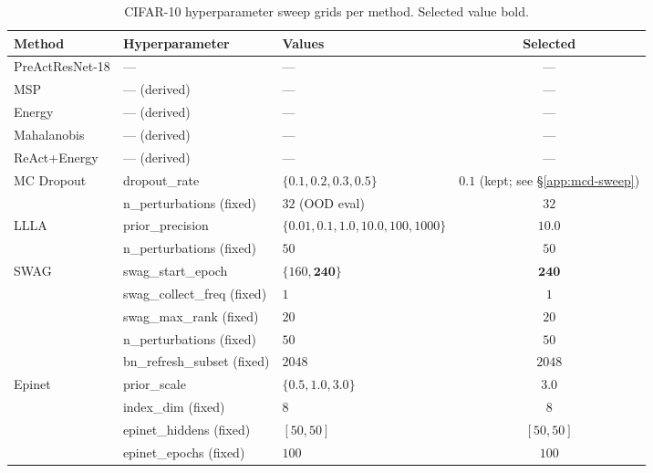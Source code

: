 \begin{table}[h]
\centering
\caption{CIFAR-10 hyperparameter sweep grids per method. Selected value bold.}
\label{tab:cifar10-sweep-grid}
\small
\begin{tabular}{l l l c}
\toprule
Method & Hyperparameter & Values & Selected \\
\midrule
PreActResNet-18 & --- & --- & --- \\
MSP             & --- (derived)              & ---                        & --- \\
Energy          & --- (derived)              & ---                        & --- \\
Mahalanobis     & --- (derived)              & ---                        & --- \\
ReAct+Energy    & --- (derived)              & ---                        & --- \\
\midrule
MC Dropout      & dropout\_rate              & $\{\mathbf{0.1}, 0.2, 0.3, 0.5\}$ & $\mathbf{0.1}$ (kept; see \S\ref{app:mcd-sweep}) \\
                & n\_perturbations (fixed)   & $32$ (OOD eval)            & $32$ \\
\midrule
LLLA            & prior\_precision           & $\{0.01, 0.1, 1.0, \mathbf{10.0}, 100, 1000\}$ & $\mathbf{10.0}$ \\
                & n\_perturbations (fixed)   & $50$                       & $50$ \\
\midrule
SWAG            & swag\_start\_epoch         & $\{160, \mathbf{240}\}$    & $\mathbf{240}$ \\
                & swag\_collect\_freq (fixed)& $1$                        & $1$ \\
                & swag\_max\_rank (fixed)    & $20$                       & $20$ \\
                & n\_perturbations (fixed)   & $50$                       & $50$ \\
                & bn\_refresh\_subset (fixed)& $2048$                     & $2048$ \\
\midrule
Epinet          & prior\_scale               & $\{0.5, 1.0, \mathbf{3.0}\}$ & $\mathbf{3.0}$ \\
                & index\_dim (fixed)         & $8$                        & $8$ \\
                & epinet\_hiddens (fixed)    & $[50, 50]$                 & $[50, 50]$ \\
                & epinet\_epochs (fixed)     & $100$                      & $100$ \\

\end{tabular}
\end{table}
